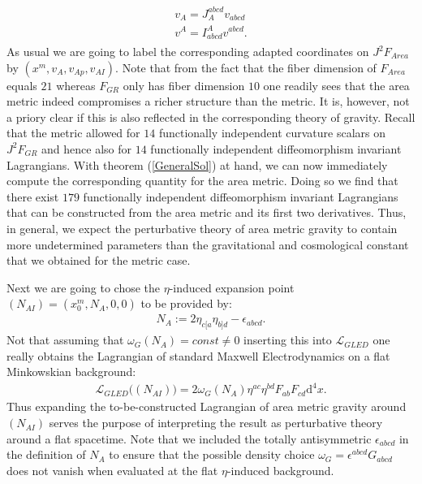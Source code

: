 \begin{align}
    \begin{aligned}
    v_A = J_A^{abcd}v_{abcd} \\
    v^A = I^A_{abcd}v^{abcd}.
    \end{aligned}
\end{align}
As usual we are going to label the corresponding adapted coordinates on $J^2F_{Area}$ by $(x^m,v_A,v_{Ap},v_{AI})$. 
Note that from the fact that the fiber dimension of $F_{Area}$ equals $21$ whereas $F_{GR}$ only has fiber dimension $10$ one readily sees that the area metric indeed compromises a richer structure than the metric. It is, however, not a priory clear if this is also reflected in the corresponding theory of gravity. Recall that the metric allowed for $14$ functionally independent curvature scalars on $J^2F_{GR}$ and hence also for $14$ functionally independent diffeomorphism invariant Lagrangians. With theorem (\ref{GeneralSol}) at hand, we can now immediately compute the corresponding quantity for the area metric. Doing so we find that there exist $179$ functionally independent diffeomorphism invariant Lagrangians that can be constructed from the area metric and its first two derivatives. Thus, in general, we expect the perturbative theory of area metric gravity to contain more undetermined parameters than the gravitational and cosmological constant that we obtained for the metric case.


Next we are going to chose the $\eta$-induced expansion point $(N_{AI}) = (x_0^m, N_A, 0,0)$ to be provided by:
\begin{align}
N_A := 2 \eta_{c[a} \eta_{b]d} - \epsilon_{abcd}.
\end{align}
Not that assuming that $\omega_G(N_A) = const \neq 0$ inserting this into $\mathcal{L}_{GLED}$ one really obtains the Lagrangian of standard Maxwell Electrodynamics on a flat Minkowskian background:
\begin{align}
    \mathcal{L}_{GLED}\bigl((N_{AI})\bigr ) = 2 \omega_G(N_A) \eta^{ac}\eta^{bd}F_{ab}F_{cd} \mathrm{d}^4x.
\end{align}
Thus expanding the to-be-constructed Lagrangian of area metric gravity around $(N_{AI})$ serves the purpose of interpreting the result as perturbative theory around a flat spacetime. Note that we included the totally antisymmetric $\epsilon_{abcd}$ in the definition of $N_A$ to ensure that  the possible density choice $\omega_G = \epsilon^{abcd}G_{abcd}$ does not vanish when evaluated at the flat $\eta$-induced background. 

